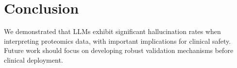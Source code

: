 \section{Conclusion}

We demonstrated that LLMs exhibit significant hallucination rates when interpreting proteomics data, with important implications for clinical safety. Future work should focus on developing robust validation mechanisms before clinical deployment.
